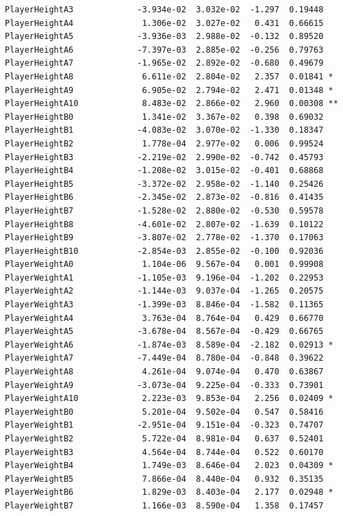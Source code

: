 \documentclass[
  super,
  preprint,
  3p]{elsarticle}
\begin{document}
\begin{verbatim}
PlayerHeightA3             -3.934e-02  3.032e-02  -1.297  0.19448    
PlayerHeightA4              1.306e-02  3.027e-02   0.431  0.66615    
PlayerHeightA5             -3.936e-03  2.988e-02  -0.132  0.89520    
PlayerHeightA6             -7.397e-03  2.885e-02  -0.256  0.79763    
PlayerHeightA7             -1.965e-02  2.892e-02  -0.680  0.49679    
PlayerHeightA8              6.611e-02  2.804e-02   2.357  0.01841 *  
PlayerHeightA9              6.905e-02  2.794e-02   2.471  0.01348 *  
PlayerHeightA10             8.483e-02  2.866e-02   2.960  0.00308 ** 
PlayerHeightB0              1.341e-02  3.367e-02   0.398  0.69032    
PlayerHeightB1             -4.083e-02  3.070e-02  -1.330  0.18347    
PlayerHeightB2              1.778e-04  2.977e-02   0.006  0.99524    
PlayerHeightB3             -2.219e-02  2.990e-02  -0.742  0.45793    
PlayerHeightB4             -1.208e-02  3.015e-02  -0.401  0.68868    
PlayerHeightB5             -3.372e-02  2.958e-02  -1.140  0.25426    
PlayerHeightB6             -2.345e-02  2.873e-02  -0.816  0.41435    
PlayerHeightB7             -1.528e-02  2.880e-02  -0.530  0.59578    
PlayerHeightB8             -4.601e-02  2.807e-02  -1.639  0.10122    
PlayerHeightB9             -3.807e-02  2.778e-02  -1.370  0.17063    
PlayerHeightB10            -2.854e-03  2.855e-02  -0.100  0.92036    
PlayerWeightA0              1.104e-06  9.567e-04   0.001  0.99908    
PlayerWeightA1             -1.105e-03  9.196e-04  -1.202  0.22953    
PlayerWeightA2             -1.144e-03  9.037e-04  -1.265  0.20575    
PlayerWeightA3             -1.399e-03  8.846e-04  -1.582  0.11365    
PlayerWeightA4              3.763e-04  8.764e-04   0.429  0.66770    
PlayerWeightA5             -3.678e-04  8.567e-04  -0.429  0.66765    
PlayerWeightA6             -1.874e-03  8.589e-04  -2.182  0.02913 *  
PlayerWeightA7             -7.449e-04  8.780e-04  -0.848  0.39622    
PlayerWeightA8              4.261e-04  9.074e-04   0.470  0.63867    
PlayerWeightA9             -3.073e-04  9.225e-04  -0.333  0.73901    
PlayerWeightA10             2.223e-03  9.853e-04   2.256  0.02409 *  
PlayerWeightB0              5.201e-04  9.502e-04   0.547  0.58416    
PlayerWeightB1             -2.951e-04  9.151e-04  -0.323  0.74707    
PlayerWeightB2              5.722e-04  8.981e-04   0.637  0.52401    
PlayerWeightB3              4.564e-04  8.744e-04   0.522  0.60170    
PlayerWeightB4              1.749e-03  8.646e-04   2.023  0.04309 *  
PlayerWeightB5              7.866e-04  8.440e-04   0.932  0.35135    
PlayerWeightB6              1.829e-03  8.403e-04   2.177  0.02948 *  
PlayerWeightB7              1.166e-03  8.590e-04   1.358  0.17457    

\end{verbatim}
\end{document}
